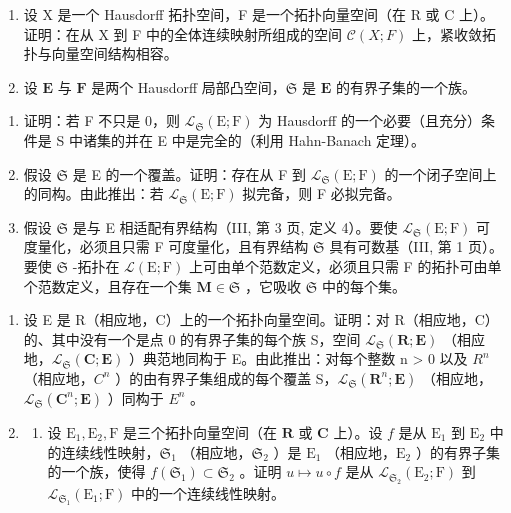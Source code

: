 \exercisegroup

\begin{enumerate}
\def\labelenumi{\arabic{enumi})}
\item
  设 X 是一个 Hausdorff 拓扑空间，F 是一个拓扑向量空间（在 R 或 C 上）。证明：在从 X 到 F 中的全体连续映射所组成的空间 \(\mathcal{C}(X; F)\) 上，紧收敛拓扑与向量空间结构相容。
\item
  设 \(\mathbf{E}\) 与 \(\mathbf{F}\) 是两个 Hausdorff 局部凸空间，\(\mathfrak{S}\) 是 \(\mathbf{E}\) 的有界子集的一个族。
\end{enumerate}

\begin{enumerate}
\def\labelenumi{\alph{enumi})}
\item
  证明：若 F 不只是 0，则 \(\mathcal{L}_{\mathfrak{S}}(\mathrm{E};\mathrm{F})\) 为 Hausdorff 的一个必要（且充分）条件是 S 中诸集的并在 E 中是完全的（利用 Hahn-Banach 定理）。
\item
  假设 \(\mathfrak{S}\) 是 E 的一个覆盖。证明：存在从 F 到 \(\mathcal{L}_{\mathfrak{S}}(\mathrm{E};\mathrm{F})\) 的一个闭子空间上的同构。由此推出：若 \(\mathcal{L}_{\mathfrak{S}}(\mathrm{E};\mathrm{F})\) 拟完备，则 F 必拟完备。
\item
  假设 \(\mathfrak{S}\) 是与 E 相适配有界结构（III, 第 3 页, 定义 4）。要使 \(\mathcal{L}_{\mathfrak{S}}(\mathrm{E};\mathrm{F})\) 可度量化，必须且只需 F 可度量化，且有界结构 \(\mathfrak{S}\) 具有可数基（III, 第 1 页）。要使 \(\mathfrak{S}\) -拓扑在 \(\mathcal{L}(\mathrm{E};\mathrm{F})\) 上可由单个范数定义，必须且只需 F 的拓扑可由单个范数定义，且存在一个集 \(\mathbf{M} \in \mathfrak{S}\) ，它吸收 \(\mathfrak{S}\) 中的每个集。
\end{enumerate}

\begin{enumerate}
\def\labelenumi{\arabic{enumi})}
\setcounter{enumi}{2}
\item
  设 E 是 R（相应地，C）上的一个拓扑向量空间。证明：对 R（相应地，C）的、其中没有一个是点 0 的有界子集的每个族 S，空间 \(\mathcal{L}_{\mathfrak{S}}(\mathbf{R};\mathbf{E})\) （相应地，\(\mathcal{L}_{\mathfrak{S}}(\mathbf{C};\mathbf{E})\) ）典范地同构于 E。由此推出：对每个整数 n \textgreater{} 0 以及 \(R^{n}\) （相应地，\(C^{n}\) ）的由有界子集组成的每个覆盖 S，\(\mathcal{L}_{\mathfrak{S}}(\mathbf{R}^{n};\mathbf{E})\) （相应地，\(\mathcal{L}_{\mathfrak{S}}(\mathbf{C}^{n};\mathbf{E})\) ）同构于 \(E^{n}\) 。
\item
  \begin{enumerate}
  \def\labelenumii{\alph{enumii})}
  \tightlist
  \item
    设 \(\mathrm{E}_1, \mathrm{E}_2, \mathrm{F}\) 是三个拓扑向量空间（在 \(\mathbf{R}\) 或 \(\mathbf{C}\) 上）。设 \(f\) 是从 \(\mathrm{E}_1\) 到 \(\mathrm{E}_2\) 中的连续线性映射，\(\mathfrak{S}_1\) （相应地，\(\mathfrak{S}_2\) ）是 \(\mathrm{E}_1\) （相应地，\(\mathrm{E}_2\) ）的有界子集的一个族，使得 \(f(\mathfrak{S}_1) \subset \mathfrak{S}_2\) 。证明 \(u \mapsto u \circ f\) 是从 \(\mathcal{L}_{\mathfrak{S}_2}(\mathrm{E}_2; \mathrm{F})\) 到 \(\mathcal{L}_{\mathfrak{S}_1}(\mathrm{E}_1; \mathrm{F})\) 中的一个连续线性映射。
  \end{enumerate}
\end{enumerate}

